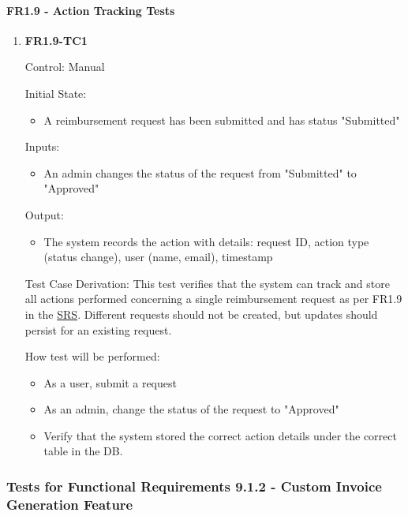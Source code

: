 \documentclass[12pt, titlepage]{article}
\begin{document}
\paragraph{FR1.9 - Action Tracking Tests}

\begin{enumerate}
    \item{\textbf{FR1.9-TC1}}
    \hypertarget{FR1.9-TC1}{}

    Control: Manual
    
    Initial State: 
    \begin{itemize}
        \item A reimbursement request has been submitted and has status "Submitted"
    \end{itemize}
    
    Inputs: 
    \begin{itemize}
        \item An admin changes the status of the request from "Submitted" to "Approved"
    \end{itemize}
    
    Output: 
    \begin{itemize}
        \item The system records the action with details: request ID, action type (status change), user (name, email), timestamp
    \end{itemize}
    
    Test Case Derivation: This test verifies that the system can track and store all actions performed concerning a single reimbursement request as per FR1.9 in the \href{https://shorturl.at/FdAgR}{SRS}. Different requests should not be created, but updates should persist for an existing request.
    
    How test will be performed:
    \begin{itemize}
        \item As a user, submit a request
        \item As an admin, change the status of the request to "Approved"
        \item Verify that the system stored the correct action details under the correct table in the DB.
    \end{itemize}
\end{enumerate}

\subsubsection{Tests for Functional Requirements 9.1.2 - Custom Invoice Generation Feature}
\end{document}
